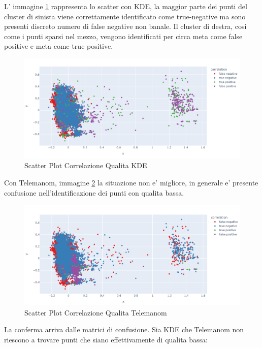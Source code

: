 L' immagine \ref{kde_quality} rappresenta lo scatter con KDE, la maggior parte dei punti del cluster di sinista viene correttamente identificato come true-negative ma sono presenti discreto numero di false negative non banale. Il cluster di destra, cosi come i punti sparsi nel mezzo, vengono identificati per circa meta come false positive e meta come true positive.
\begin{figure}[t]
	\centering
	\includegraphics[width=14cm, scale=1]{images/correlation_ssb1_quality_plot.png}
	\caption{Scatter Plot Correlazione Qualita KDE}
	\label{kde_quality}
\end{figure}

Con Telemanom, immagine \ref{worst_clf_quality} la situazione non e' migliore, in generale e' presente confusione nell'identificazione dei punti con qualita bassa.


\begin{figure}[t]
	\centering
	\includegraphics[width=14cm, scale=1]{images/worst_correlation_ssb1_quality_plot}
	\caption{Scatter Plot Correlazione Qualita Telemanom}
	\label{worst_clf_quality}
\end{figure}

La conferma arriva dalle matrici di confusione. Sia KDE che Telemanom non riescono a trovare punti che siano effettivamente di qualita bassa:



